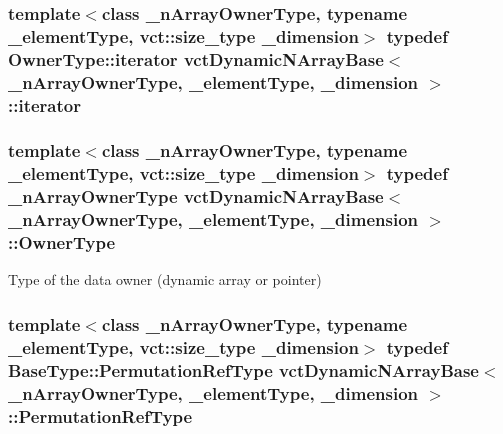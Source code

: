\subsubsection[{iterator}]{\setlength{\rightskip}{0pt plus 5cm}template$<$class \+\_\+n\+Array\+Owner\+Type, typename \+\_\+element\+Type, vct\+::size\+\_\+type \+\_\+dimension$>$ typedef Owner\+Type\+::iterator {\bf vct\+Dynamic\+N\+Array\+Base}$<$ \+\_\+n\+Array\+Owner\+Type, \+\_\+element\+Type, \+\_\+dimension $>$\+::{\bf iterator}}\label{classvct_dynamic_n_array_base_afe6d2a8cd86a6b3a0828249b976389ba}
\hypertarget{classvct_dynamic_n_array_base_a856048c87677204bd0338cce0e14abf6}{}
\subsubsection[{Owner\+Type}]{\setlength{\rightskip}{0pt plus 5cm}template$<$class \+\_\+n\+Array\+Owner\+Type, typename \+\_\+element\+Type, vct\+::size\+\_\+type \+\_\+dimension$>$ typedef \+\_\+n\+Array\+Owner\+Type {\bf vct\+Dynamic\+N\+Array\+Base}$<$ \+\_\+n\+Array\+Owner\+Type, \+\_\+element\+Type, \+\_\+dimension $>$\+::{\bf Owner\+Type}}\label{classvct_dynamic_n_array_base_a856048c87677204bd0338cce0e14abf6}
Type of the data owner (dynamic array or pointer) \hypertarget{classvct_dynamic_n_array_base_a32a4177a0764b9b796ed4c41fbd8c2ad}{}
\subsubsection[{Permutation\+Ref\+Type}]{\setlength{\rightskip}{0pt plus 5cm}template$<$class \+\_\+n\+Array\+Owner\+Type, typename \+\_\+element\+Type, vct\+::size\+\_\+type \+\_\+dimension$>$ typedef {\bf Base\+Type\+::\+Permutation\+Ref\+Type} {\bf vct\+Dynamic\+N\+Array\+Base}$<$ \+\_\+n\+Array\+Owner\+Type, \+\_\+element\+Type, \+\_\+dimension $>$\+::{\bf Permutation\+Ref\+Type}}\label{classvct_dynamic_n_array_base_a32a4177a0764b9b796ed4c41fbd8c2ad}
\hypertarget{classvct_dynamic_n_array_base_a4a0adcb47fb464b8dd1a1e2495a52468}{}
